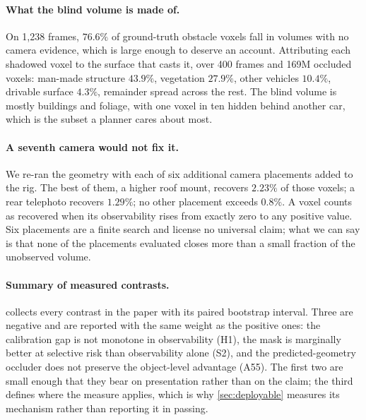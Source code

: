 \documentclass[10pt,twocolumn,letterpaper]{article}
\begin{document}
\paragraph{What the blind volume is made of.} On 1{,}238 frames, $76.6\%$
of ground-truth obstacle voxels fall in volumes with no camera evidence,
which is large enough to deserve an account. Attributing each shadowed
voxel to the surface that casts it, over 400 frames and 169M occluded
voxels: man-made structure $43.9\%$, vegetation $27.9\%$, other vehicles
$10.4\%$, drivable surface $4.3\%$, remainder spread across the rest. The
blind volume is mostly buildings and foliage, with one voxel in ten hidden
behind another car, which is the subset a planner cares about most.

\paragraph{A seventh camera would not fix it.} We
re-ran the geometry with each of six additional camera placements added to
the rig. The best of them, a higher roof mount, recovers $2.23\%$ of those
voxels; a rear telephoto recovers $1.29\%$; no other placement exceeds
$0.8\%$. A voxel counts as recovered when its observability rises from exactly zero
to any positive value. Six placements are a finite search and license no
universal claim; what we can say is that none of the placements evaluated
closes more than a small fraction of the unobserved volume.

\paragraph{Summary of measured contrasts.}
 collects every contrast in the paper with its paired
bootstrap interval. Three are negative and are reported with the same
weight as the positive ones: the calibration gap is not monotone in
observability (H1), the mask is marginally better at selective risk than
observability alone (S2), and the predicted-geometry occluder does not
preserve the object-level advantage (A55). The first two are small enough
that they bear on presentation rather than on the claim; the third defines
where the measure applies, which is why \cref{sec:deployable} measures its
mechanism rather than reporting it in passing.

\end{document}
